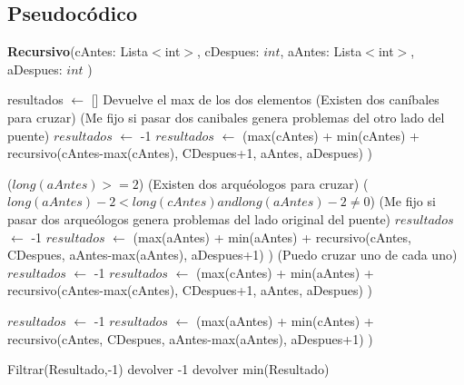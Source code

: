 \documentclass[spanish,12pt]{article}
\begin{document}
\subsection{Pseudocódico}
\begin{algorithm}[H]{\textbf{Recursivo}(cAntes: Lista$<$int$>$, cDespues: $int$, aAntes: Lista$<$int$>$, aDespues: $int$ )}
	\begin{algorithmic}[1]
		\State resultados $\gets$ []
			\State Devuelve el max de los dos elementos
		\Else
			 \Comment (Existen dos caníbales para cruzar)
				 \Comment (Me fijo si pasar dos canibales genera problemas del otro lado del puente)
					\State $resultados$ $\gets$ -1
				\Else
					\State $resultados$ $\gets$ (max(cAntes) + min(cAntes) + recursivo(cAntes-max(cAntes), CDespues+1, aAntes, aDespues) )
				\EndIf
			\EndIf

			\If($long(aAntes)>=2$) \Comment (Existen dos arquéologos para cruzar)
				\If($long(aAntes)-2<long(cAntes) and long(aAntes)-2 \neq 0$) \Comment (Me fijo si pasar dos arqueólogos genera problemas del lado original del puente)
					\State $resultados$ $\gets$ -1
				\Else
					\State$resultados$ $\gets$ (max(aAntes) + min(aAntes) + recursivo(cAntes, CDespues, aAntes-max(aAntes), aDespues+1) )
				\EndIf
			 \Comment (Puedo cruzar uno de cada uno)
					\State $resultados$ $\gets$ -1
				\Else
					\State $resultados$ $\gets$ (max(cAntes) + min(aAntes) + recursivo(cAntes-max(cAntes), CDespues+1, aAntes, aDespues) )
				\EndIf

					\State $resultados$ $\gets$ -1
				\Else
					\State $resultados$ $\gets$ (max(aAntes) + min(cAntes) + recursivo(cAntes, CDespues, aAntes-max(aAntes), aDespues+1) )
				\EndIf

			\EndIf

			Filtrar(Resultado,-1)
				\State devolver -1
			\Else
				\State devolver min(Resultado)

			\EndIf

		\EndIf



	\end{algorithmic}
\end{algorithm}


\end{document}
